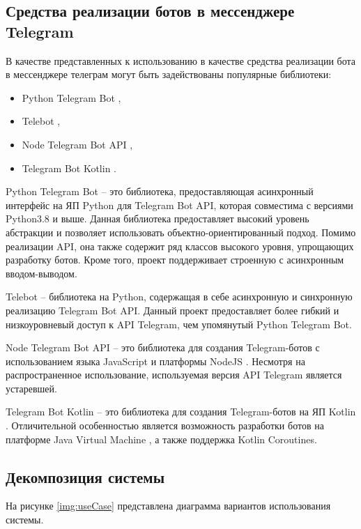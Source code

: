 \subsection{Средства реализации ботов в мессенджере Telegram}

В качестве представленных к использованию в качестве средства реализации бота в мессенджере телеграм могут быть задействованы популярные библиотеки:

\begin{itemize}
	\item Python Telegram Bot \cite{pythonTelegram},
	\item Telebot \cite{telebot},
	\item Node Telegram Bot API \cite{nodeTelegram},
	\item Telegram Bot Kotlin \cite{kotlinTelegram}.
\end{itemize}

Python Telegram Bot -- это библиотека, предоставляющая асинхронный интерфейс на ЯП Python для Telegram Bot API, которая совместима с версиями Python3.8 \cite{Python} и выше. Данная библиотека предоставляет высокий уровень абстракции и позволяет использовать объектно-ориентированный подход. Помимо реализации API, она также содержит ряд классов высокого уровня, упрощающих разработку ботов. Кроме того, проект поддерживает строенную с асинхронным вводом-выводом. \cite{pythonTelegram}

Telebot -- библиотека на Python, содержащая в себе асинхронную и синхронную реализацию Telegram Bot API. Данный проект предоставляет более гибкий и низкоуровневый доступ к API Telegram, чем упомянутый Python Telegram Bot. \cite{telebot}

Node Telegram Bot API -- это библиотека для создания Telegram-ботов с использованием языка JavaScript \cite{js} и платформы NodeJS \cite{nodejs}. Несмотря на распространенное использование, используемая версия API Telegram является устаревшей. \cite{nodeTelegram}

Telegram Bot Kotlin -- это библиотека для создания Telegram-ботов на ЯП Kotlin \cite{Kotlin}. Отличительной особенностью является возможность разработки ботов на платформе Java Virtual Machine \cite{jvm}, а также поддержка Kotlin Coroutines. \cite{kotlinTelegram}

\subsection{Декомпозиция системы}

На рисунке \ref{img:useCase} представлена диаграмма вариантов использования системы.

